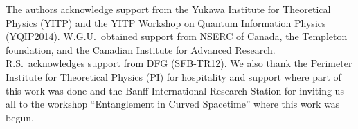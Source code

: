 \documentclass[aps,prd,showpacs,amssymb,nofootinbib,twocolumn]{revtex4}
\begin{document}
\acknowledgments

The authors acknowledge support from the 
Yukawa Institute for Theoretical Physics (YITP) 
and the YITP Workshop on Quantum Information Physics (YQIP2014).  
%
W.G.U.\ obtained support from NSERC of Canada, the Templeton foundation, 
and the Canadian Institute for Advanced Research.
%
R.S.\ acknowledges support from DFG (SFB-TR12). 
%
We also thank the Perimeter Institute for Theoretical Physics (PI)
for hospitality and support where part of this work was done
and the Banff International Research Station for inviting us all to the 
workshop ``Entanglement in Curved Spacetime'' where this work was begun. 
\end{document}
